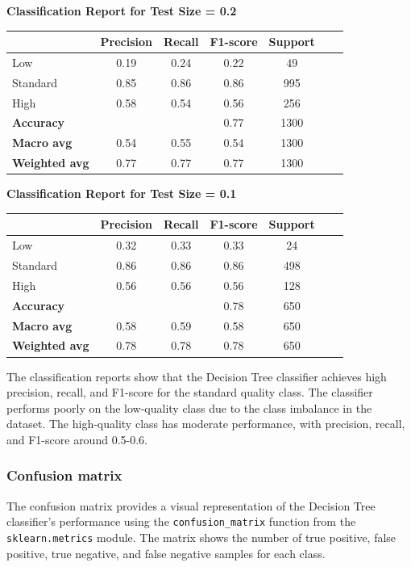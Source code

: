 \vspace{2em}

\textbf{Classification Report for Test Size = 0.2}

\begin{tabular}{lcccccc}
\hline
 & \textbf{Precision} & \textbf{Recall} & \textbf{F1-score} & \textbf{Support} \\
\hline
Low & 0.19 & 0.24 & 0.22 & 49 \\
Standard & 0.85 & 0.86 & 0.86 & 995 \\
High & 0.58 & 0.54 & 0.56 & 256 \\
\hline
\textbf{Accuracy} & & & 0.77 & 1300 \\
\textbf{Macro avg} & 0.54 & 0.55 & 0.54 & 1300 \\
\textbf{Weighted avg} & 0.77 & 0.77 & 0.77 & 1300 \\
\hline
\end{tabular}

\vspace{200em}

\textbf{Classification Report for Test Size = 0.1}

\begin{tabular}{lcccccc}
\hline
 & \textbf{Precision} & \textbf{Recall} & \textbf{F1-score} & \textbf{Support} \\
\hline
Low & 0.32 & 0.33 & 0.33 & 24 \\
Standard & 0.86 & 0.86 & 0.86 & 498 \\
High & 0.56 & 0.56 & 0.56 & 128 \\
\hline
\textbf{Accuracy} & & & 0.78 & 650 \\
\textbf{Macro avg} & 0.58 & 0.59 & 0.58 & 650 \\
\textbf{Weighted avg} & 0.78 & 0.78 & 0.78 & 650 \\
\hline
\end{tabular}

The classification reports show that the Decision Tree classifier achieves high precision, recall, and F1-score for the standard quality class. The classifier performs poorly on the low-quality class due to the class imbalance in the dataset. The high-quality class has moderate performance, with precision, recall, and F1-score around 0.5-0.6.

\subsubsection{Confusion matrix}

The confusion matrix provides a visual representation of the Decision Tree classifier's performance using the \texttt{confusion\_matrix} function from the \texttt{sklearn.metrics} module. The matrix shows the number of true positive, false positive, true negative, and false negative samples for each class.

